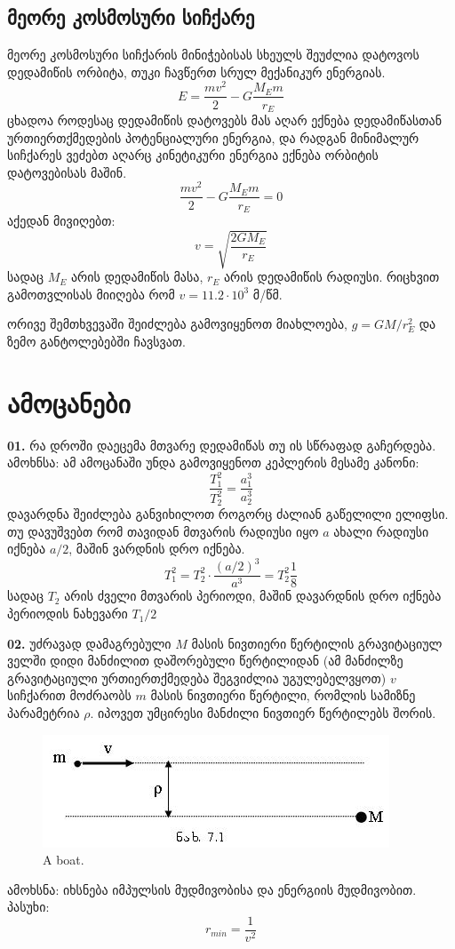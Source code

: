 \documentclass[a4paper]{article}
\begin{document}
	\subsection{მეორე კოსმოსური სიჩქარე}
		მეორე კოსმოსური სიჩქარის მინიჭებისას სხეულს შეუძლია დატოვოს დედამიწის ორბიტა, თუკი ჩავწერთ სრულ მექანიკურ ენერგიას. 
			\begin{equation}
				E = \frac{mv^2}{2} - G\frac{M_E m}{r_E}
			\end{equation}
ცხადოა როდესაც დედამიწის დატოვებს მას აღარ ექნება დედამიწასთან ურთიერთქმედების პოტენციალური ენერგია, და რადგან მინიმალურ სიჩქარეს ვეძებთ აღარც კინეტიკური ენერგია ექნება ორბიტის დატოვებისას მაშინ.
			\begin{equation}
				\frac{mv^2}{2} - G\frac{M_E m}{r_E} = 0
			\end{equation}
აქედან მივიღებთ:
			\begin{equation}
				v = \sqrt{\frac{2GM_E}{r_E}}
			\end{equation}
სადაც $M_E$ არის დედამიწის მასა, $r_E$ არის დედამიწის რადიუსი. რიცხვით გამოთვლისას მიიღება რომ $v = 11.2 \cdot 10^3$ მ/წმ.

ორივე შემთხვევაში შეიძლება გამოვიყენოთ მიახლოება, $g = GM/r_E^2$ და ზემო განტოლებებში ჩავსვათ.


\section{ამოცანები}
\textbf{01.} რა დროში დაეცემა მთვარე დედამიწას თუ ის სწრაფად გაჩერდება.\\
ამოხნსა: ამ ამოცანაში უნდა გამოვიყენოთ კეპლერის მესამე კანონი:
	\begin{equation}
		\frac{T_1^2}{T_2^2} = \frac{a_1^3}{a_2^3}
	\end{equation}
დავარდნა შეიძლება განვიხილოთ როგორც ძალიან გაწელილი ელიფსი. თუ დავუშვებთ რომ თავიდან მთვარის რადიუსი იყო $a$ ახალი რადიუსი იქნება $a/2$, მაშინ ვარდნის დრო იქნება.
	\begin{equation}
		T_1^2 = T_2^2\cdot\frac{(a/2)^3}{a^3} = T_2^2 \frac{1}{8}
	\end{equation}
სადაც $T_2$ არის ძველი მთვარის პერიოდი, მაშინ დავარდნის დრო იქნება პერიოდის ნახევარი $T_1/2$

\textbf{02.} უძრავად დამაგრებული $M$ მასის ნივთიერი წერტილის გრავიტაციულ ველში დიდი მანძილით დაშორებული წერტილიდან (ამ მანძილზე
გრავიტაციული ურთიერთქმედება შეგვიძლია უგულებელვყოთ) $v$ სიჩქარით მოძრაობს $m$ მასის ნივთიერი წერტილი, რომლის სამიზნე პარამეტრია $\rho$. იპოვეთ უმცირესი მანძილი ნივთიერ წერტილებს შორის.
		\begin{figure}[H]
           \includegraphics[width=0.2\columnwidth]{figures/fig_1}
           \caption{A boat.}
           \label{fig:boat1}
        \end{figure}
        
ამოხსნა:	იხსნება იმპულსის მუდმივობისა და ენერგიის მუდმივობით.\\
პასუხი: $$ r_{min} = \frac{1}{v^2} $$
\end{document}
